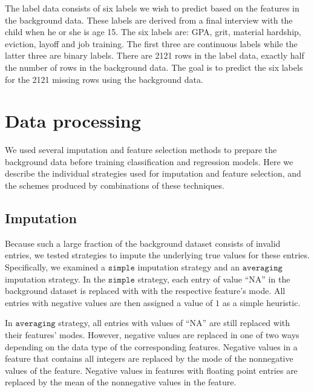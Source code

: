 \documentclass{article} %
\begin{document}
The label data consists of six labels we wish to predict based on the features in the background data. These labels are derived from a final interview with the child when he or she is age 15. The six labels are: GPA, grit, material hardship, eviction, layoff and job training. The first three are continuous labels while the latter three are binary labels. There are 2121 rows in the label data, exactly half the number of rows in the background data. The goal is to predict the six labels for the 2121 missing rows using the background data.




\section{Data processing}
\label{sec:datapreprocessing}

We used several imputation and feature selection methods to prepare the background data before training classification and regression models. Here we describe the individual strategies used for imputation and feature selection, and the schemes produced by combinations of these techniques.


\subsection{Imputation}
\label{sec:imputation}

Because such a large fraction of the background dataset consists of invalid entries, we tested strategies to impute the underlying true values for these entries. Specifically, we examined a $\texttt{simple}$ imputation strategy and an $\texttt{averaging}$ imputation strategy. In the $\texttt{simple}$ strategy, each entry of value ``NA'' in the background dataset is replaced with with the respective feature's mode. All entries with negative values are then assigned a value of $1$ as a simple heuristic.

In $\texttt{averaging}$ strategy, all entries with values of ``NA'' are still replaced with their features' modes. However, negative values are replaced in one of two ways depending on the data type of the corresponding features. Negative values in a feature that contains all integers are replaced by the mode of the nonnegative values of the feature. Negative values in features with floating point entries are replaced by the mean of the nonnegative values in the feature.
\end{document}
